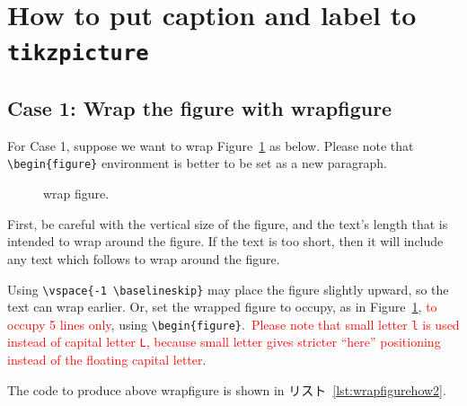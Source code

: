 \documentclass[../geometrymemo.tex]{subfiles}
\begin{document}
\section{How to put caption and label to \texttt{tikzpicture}}

\subsection{Case 1: Wrap the figure with wrapfigure}

For Case 1, suppose we want to wrap Figure~\ref{fig:wrap1} as below. Please note that \verb|\begin{figure}| environment is better to be set as a new paragraph.

\begin{figure}
    \centering
    \vspace{-0.5 \baselineskip}
    \caption{wrap figure.} \label{fig:wrap1}
\end{figure}
First, be careful with the vertical size of the figure, and the text's length that is intended to wrap around the figure. If the text is too short, then it will include any text which follows to wrap around the figure.

Using \verb|\vspace{-1 \baselineskip}| may place the figure slightly upward, so the text can wrap earlier. Or, set the wrapped figure to occupy, as in Figure~\ref{fig:wrap1}, \textcolor{red}{to occupy 5 lines only}, using \verb|\begin{figure}|.\ \textcolor{red}{Please note that small letter \texttt{l} is used instead of capital letter \texttt{L}, because small letter gives stricter ``here'' positioning instead of the floating capital letter}.

The code to produce above wrapfigure is shown in リスト~\ref{lst:wrapfigurehow2}.
\end{document}
